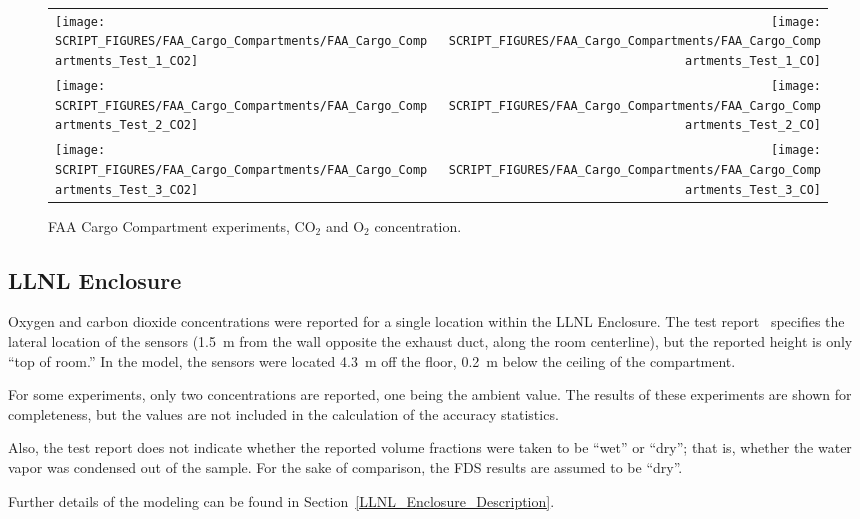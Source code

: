 \begin{figure}[h]
\begin{tabular*}{\textwidth}{l@{\extracolsep{\fill}}r}
\texttt{[image: SCRIPT\_FIGURES/FAA\_Cargo\_Compartments/FAA\_Cargo\_Compartments\_Test\_1\_CO2]} &
\texttt{[image: SCRIPT\_FIGURES/FAA\_Cargo\_Compartments/FAA\_Cargo\_Compartments\_Test\_1\_CO]} \\
\texttt{[image: SCRIPT\_FIGURES/FAA\_Cargo\_Compartments/FAA\_Cargo\_Compartments\_Test\_2\_CO2]} &
\texttt{[image: SCRIPT\_FIGURES/FAA\_Cargo\_Compartments/FAA\_Cargo\_Compartments\_Test\_2\_CO]} \\
\texttt{[image: SCRIPT\_FIGURES/FAA\_Cargo\_Compartments/FAA\_Cargo\_Compartments\_Test\_3\_CO2]} &
\texttt{[image: SCRIPT\_FIGURES/FAA\_Cargo\_Compartments/FAA\_Cargo\_Compartments\_Test\_3\_CO]}
\end{tabular*}
\caption{FAA Cargo Compartment experiments, CO$_2$ and O$_2$ concentration.}
\label{FAA_Cargo_CO2_CO}
\end{figure}

\clearpage

\subsection{LLNL Enclosure}

Oxygen and carbon dioxide concentrations were reported for a single location within the LLNL Enclosure. The test report~\cite{Foote:LLNL1986} specifies the lateral location of the sensors (1.5~m from the wall opposite the exhaust duct, along the room centerline), but the reported height is only ``top of room.'' In the model, the sensors were located 4.3~m off the floor, 0.2~m below the ceiling of the compartment.

For some experiments, only two concentrations are reported, one being the ambient value. The results of these experiments are shown for completeness, but the values are not included in the calculation of the accuracy statistics.

Also, the test report does not indicate whether the reported volume fractions were taken to be ``wet'' or ``dry''; that is, whether the water vapor was condensed out of the sample. For the sake of comparison, the FDS results are assumed to be ``dry''.

Further details of the modeling can be found in Section~\ref{LLNL_Enclosure_Description}.

\newpage

